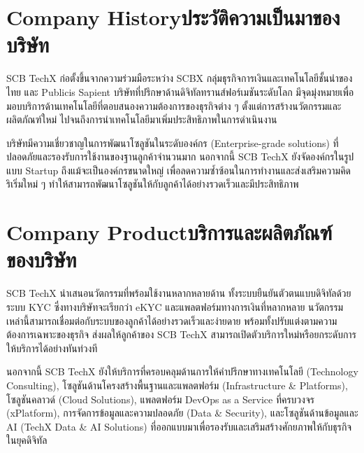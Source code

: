 \section{\ifenglish Company History\else ประวัติความเป็นมาของบริษัท\fi}

SCB TechX \cite{techxWebsite} ก่อตั้งขึ้นจากความร่วมมือระหว่าง SCBX กลุ่มธุรกิจการเงินและเทคโนโลยีชั้นนำของไทย และ Publicis Sapient บริษัทที่ปรึกษาด้านดิจิทัลทรานส์ฟอร์เมชันระดับโลก มีจุดมุ่งหมายเพื่อมอบบริการด้านเทคโนโลยีที่ตอบสนองความต้องการของธุรกิจต่าง ๆ ตั้งแต่การสร้างนวัตกรรมและผลิตภัณฑ์ใหม่ ไปจนถึงการนำเทคโนโลยีมาเพิ่มประสิทธิภาพในการดำเนินงาน

บริษัทมีความเชี่ยวชาญในการพัฒนาโซลูชันในระดับองค์กร (Enterprise-grade solutions) ที่ปลอดภัยและรองรับการใช้งานของฐานลูกค้าจำนวนมาก นอกจากนี้ SCB TechX ยังจัดองค์กรในรูปแบบ Startup ถึงแม้จะเป็นองค์กรขนาดใหญ่ เพื่อลดความซ้ำซ้อนในการทำงานและส่งเสริมความคิดริเริ่มใหม่ ๆ ทำให้สามารถพัฒนาโซลูชันให้กับลูกค้าได้อย่างรวดเร็วและมีประสิทธิภาพ


\section{\ifenglish Company Product\else บริการและผลิตภัณฑ์ของบริษัท\fi}
SCB TechX นำเสนอนวัตกรรมที่พร้อมใช้งานหลากหลายด้าน \cite{techxProduct} ทั้งระบบยืนยันตัวตนแบบดิจิทัลด้วยระบบ KYC \cite{whatIsKYC} ซึ่งทางบริษัทจะเรียกว่า eKYC และแพลตฟอร์มทางการเงินที่หลากหลาย นวัตกรรมเหล่านี้สามารถเชื่อมต่อกับระบบของลูกค้าได้อย่างรวดเร็วและง่ายดาย พร้อมทั้งปรับแต่งตามความต้องการเฉพาะของธุรกิจ ส่งผลให้ลูกค้าของ SCB TechX สามารถเปิดตัวบริการใหม่หรือยกระดับการให้บริการได้อย่างทันท่วงที

นอกจากนี้ SCB TechX ยังให้บริการที่ครอบคลุมด้านการให้คำปรึกษาทางเทคโนโลยี (Technology Consulting), โซลูชันด้านโครงสร้างพื้นฐานและแพลตฟอร์ม (Infrastructure \& Platforms), โซลูชันคลาวด์ (Cloud Solutions), แพลตฟอร์ม DevOps as a Service ที่ครบวงจร (xPlatform), การจัดการข้อมูลและความปลอดภัย (Data \& Security), และโซลูชันด้านข้อมูลและ AI (TechX Data \& AI Solutions) ที่ออกแบบมาเพื่อรองรับและเสริมสร้างศักยภาพให้กับธุรกิจในยุคดิจิทัล

\clearpage

